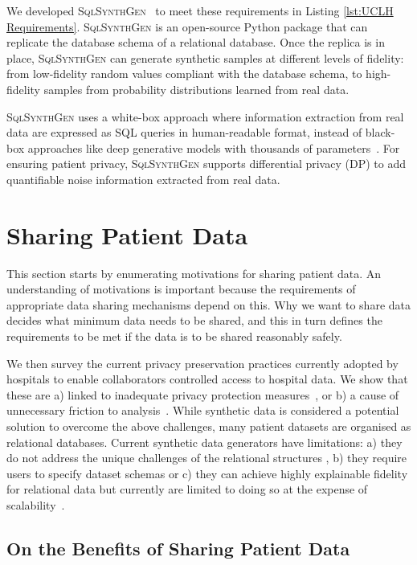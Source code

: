 \documentclass[11pt]{article}
\begin{document}
We developed \textsc{SqlSynthGen}~\cite{repository} to meet these requirements in Listing \ref{lst:UCLH Requirements}. \textsc{SqlSynthGen} is an open-source Python package that can replicate the database schema of a relational database. Once the replica is in place, \textsc{SqlSynthGen} can generate synthetic samples at different levels of fidelity: from low-fidelity random values compliant with the database schema, to high-fidelity samples from probability distributions learned from real data. 

\textsc{SqlSynthGen} uses a white-box approach where information extraction from real data are expressed as SQL queries in human-readable format, instead of black-box approaches like deep generative models with thousands of parameters~\cite{DBLP:journals/pami/Bond-TaylorLLW22}. For ensuring patient privacy, \textsc{SqlSynthGen} supports differential privacy (DP)\cite{DworkR14} to add quantifiable noise information extracted from real data.

\section{Sharing Patient Data}

This section starts by enumerating motivations for sharing patient data. An understanding of motivations is important because the requirements of appropriate data sharing mechanisms depend on this. Why we want to share data decides what minimum data needs to be shared, and this in turn defines the requirements to be met if the data is to be shared reasonably safely.

We then survey the current privacy preservation practices currently adopted by hospitals to enable collaborators controlled access to hospital data.  We show that these are  a) linked to inadequate privacy protection measures~\cite{near2021, tucker2020}, or b) a cause of unnecessary friction to analysis~\cite{ODonovan2023}. While synthetic data is considered a potential solution to overcome the above challenges, many patient datasets are organised as relational databases. Current synthetic data generators have limitations: a) they do not address the unique challenges of the relational structures \cite{Nowok2016}\cite{Synthea2020}, b) they require users to specify dataset schemas \cite{Synth2021} or c) they can achieve highly explainable fidelity for relational data but currently are limited to doing so at the expense of scalability~\cite{Cai2023}.

\subsection{On the Benefits of Sharing Patient Data}
\end{document}
